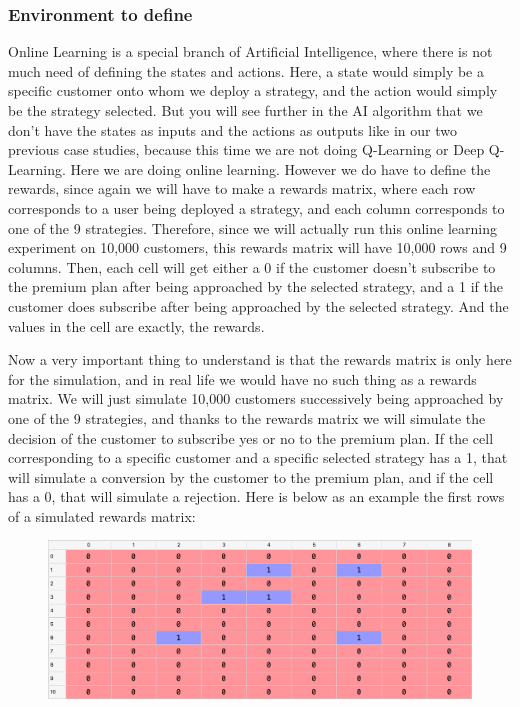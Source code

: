 \documentclass[]{book}
\begin{document}
\subsubsection{Environment to define}

Online Learning is a special branch of Artificial Intelligence, where there is not much need of defining the states and actions. Here, a state would simply be a specific customer onto whom we deploy a strategy, and the action would simply be the strategy selected. But you will see further in the AI algorithm that we don't have the states as inputs and the actions as outputs like in our two previous case studies, because this time we are not doing Q-Learning or Deep Q-Learning. Here we are doing online learning. However we do have to define the rewards, since again we will have to make a rewards matrix, where each row corresponds to a user being deployed a strategy, and each column corresponds to one of the 9 strategies. Therefore, since we will actually run this online learning experiment on 10,000 customers, this rewards matrix will have 10,000 rows and 9 columns. Then, each cell will get either a 0 if the customer doesn't subscribe to the premium plan after being approached by the selected strategy, and a 1 if the customer does subscribe after being approached by the selected strategy. And the values in the cell are exactly, the rewards.

Now a very important thing to understand is that the rewards matrix is only here for the simulation, and in real life we would have no such thing as a rewards matrix. We will just simulate 10,000 customers successively being approached by one of the 9 strategies, and thanks to the rewards matrix we will simulate the decision of the customer to subscribe yes or no to the premium plan. If the cell corresponding to a specific customer and a specific selected strategy has a 1, that will simulate a conversion by the customer to the premium plan, and if the cell has a 0, that will simulate a rejection. Here is below as an example the first rows of a simulated rewards matrix:

\begin{figure}[!htbp]
        \begin{center}
            \includegraphics[scale=0.49]{Rewards_Matrix.png}
        \end{center}
\end{figure}
\end{document}
